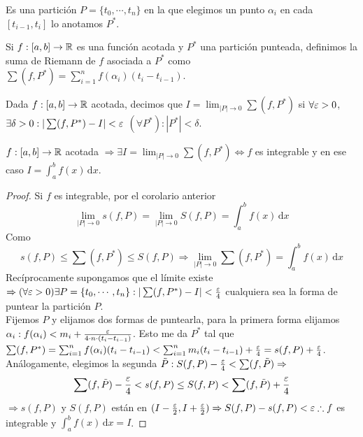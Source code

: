 \begin{definition}
  Es una partición $P = \{t_0, \cdots, t_n\}$ en la que elegimos un punto $\alpha_i$ en cada $[t_{i-1}, t_i]$ lo anotamos $P^*$.
\end{definition}

\begin{definition}
  Si $f: [a,b] \to \mathbb{R}$ es una función acotada y $P^*$ una partición punteada, definimos la suma de Riemann de $f$ asociada a $P^*$ como $\sum (f, P^*) = \sum_{i = 1}^n f(\alpha_i) (t_i - t_{i-1})$.
\end{definition}

\begin{definition}
  Dada $f: [a, b] \to \mathbb{R}$ acotada, decimos que $I = \lim_{|P| \to 0} \sum (f, P^*)$ si $\forall \varepsilon > 0$, $\exists \delta > 0 : | \sum (f, P^*) - I| < \varepsilon$ $(\forall P^*) : |P^*| < \delta$.
\end{definition}

\begin{theorem}
  $f: [a, b] \to \mathbb{R}$ acotada $\Rightarrow \exists I = \lim_{|P| \to 0} \sum (f, P^*) \iff f$ es integrable y en ese caso $I = \int_a^b f(x) \, \mathrm{d}x$.
  \begin{proof}
    Si $f$ es integrable, por el corolario anterior \begin{equation}
      \lim_{|P| \to 0} s(f, P) = \lim_{|P| \to 0} S(f, P) = \int_a^b f(x) \, \mathrm{d}x
    \end{equation}
    Como \begin{equation}s(f, P) \leq \sum(f, P^*) \leq S(f, P) \Rightarrow \lim_{|P| \to 0} \sum(f, P^*) = \int_a^b f(x) \, \mathrm{d}x \end{equation}
    Recíprocamente supongamos que el límite existe $\Rightarrow (\forall \varepsilon > 0) \exists P = \{ t_0, \cdots, t_n \} : |\sum (f, P^*) - I| < \frac{\varepsilon}{4}$ cualquiera sea la forma de puntear la partición $P$. \\
    Fijemos $P$ y elijamos dos formas de puntearla, para la primera forma elijamos $\alpha_i : f(\alpha_i) < m_i + \frac{\varepsilon}{4 \cdot n \cdot (t_i - t_{i-1})}$. Esto me da $P^*$ tal que $\sum (f, P^*) = \sum_{i = 1}^n f(\alpha_i) (t_i - t_{i-1}) < \sum_{i = 1}^n m_i (t_i - t_{i-1}) + \frac{\varepsilon}{4} = s(f, P) + \frac{\varepsilon}{4}$. \\
    Análogamente, elegimos la segunda $\tilde{P} : S(f, P) - \frac{\varepsilon}{4} < \sum (f, \tilde{P}) \Rightarrow$
    \begin{equation}
      \sum (f, \tilde{P}) - \frac{\varepsilon}{4} < s(f, P) \leq S(f, P) < \sum (f, \tilde{P}) + \frac{\varepsilon}{4}
    \end{equation}
    $\Rightarrow s(f, P)$ y $S(f, P)$ están en $(I - \frac{\varepsilon}{2}, I + \frac{\varepsilon}{2}) \Rightarrow S(f, P)- s(f, P) < \varepsilon \therefore f$ es integrable y $\int_a^b f(x) \, \mathrm{d}x = I$.
  \end{proof}
\end{theorem}

